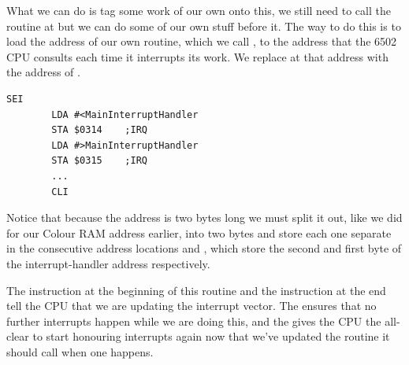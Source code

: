 What we can do is tag some work of our own onto this, we still need to call the routine at  but we can do some of our
own stuff before it. The way to do this is to load the address of our own routine, which we call , to
the address that the 6502 CPU consults each time it interrupts its work. We replace  at that address with the address
of .  
\begin{lstlisting}[escapechar=\%]
        SEI 
        LDA #<MainInterruptHandler
        STA $0314    ;IRQ
        LDA #>MainInterruptHandler
        STA $0315    ;IRQ
        ...
        CLI 
\end{lstlisting}

Notice that because the address is two bytes long we must split it out, like we did for our Colour RAM address earlier, into 
two bytes and store each one separate in the consecutive address locations  and , which store
the second and first byte of the interrupt-handler address respectively. 

The  instruction at the beginning of this routine and the  instruction at the end tell the CPU that we 
are updating the interrupt vector. The  ensures that no further interrupts happen while we are doing this, and the
 gives the CPU the all-clear to start honouring interrupts again now that we've updated the routine it should call
when one happens.


